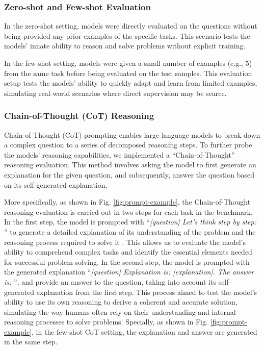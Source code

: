 \subsubsection{Zero-shot and Few-shot Evaluation}

In the zero-shot setting, models were directly evaluated on the questions without being provided any prior examples of the specific tasks. This scenario tests the models' innate ability to reason and solve problems without explicit training.

In the few-shot setting, models were given a small number of examples (e.g., 5) from the same task before being evaluated on the test samples. This evaluation setup tests the models' ability to quickly adapt and learn from limited examples, simulating real-world scenarios where direct supervision may be scarce.

\subsubsection{Chain-of-Thought (CoT) Reasoning} Chain-of-Thought (CoT) prompting \citep{wei2022chain} enables large language models to break down a complex question to a series of decomposed reasoning steps. To further probe the models' reasoning capabilities, we implemented a ``Chain-of-Thought'' reasoning evaluation. This method involves asking the model to first generate an explanation for the given question, and subsequently, answer the question based on its self-generated explanation. 

More specifically, as shown in Fig. \ref{fig:prompt-example}, the Chain-of-Thought reasoning evaluation is carried out in two steps for each task in the benchmark. In the first step, the model is prompted with ``\textit{[question] Let's think step by step: }'' to generate a detailed explanation of its understanding of the problem and the reasoning process required to solve it \citep{zhang2022automatic}. This allows us to evaluate the model's ability to comprehend complex tasks and identify the essential elements needed for successful problem-solving. In the second step, the model is prompted with the generated explanation ``\textit{[question] Explanation is: [explanation]. The answer is: }'', and provide an answer to the question, taking into account its self-generated explanation from the first step. This process aimed to test the model's ability to use its own reasoning to derive a coherent and accurate solution, simulating the way humans often rely on their understanding and internal reasoning processes to solve problems. Specially, as shown in Fig. \ref{fig:prompt-example}, in the few-shot CoT setting, the explanation and answer are generated in the same step. 
